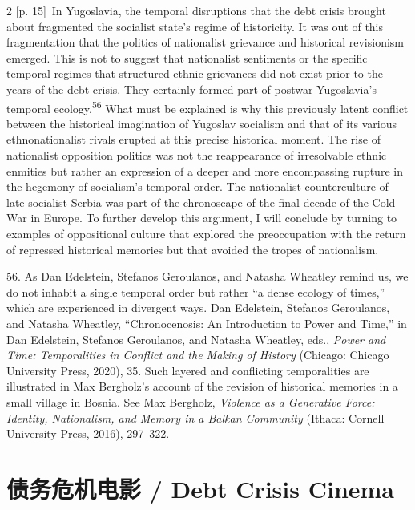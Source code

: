 \documentclass[10pt,a4paper]{article}
\begin{document}
\begin{paracol}{2}
{\scriptsize\color{gray} [p. 15]}\ In Yugoslavia, the temporal disruptions that the debt crisis brought about fragmented the socialist state’s regime of historicity. It was out of this fragmentation that the politics of nationalist grievance and historical revisionism emerged. This is not to suggest that nationalist sentiments or the specific temporal regimes that structured ethnic grievances did not exist prior to the years of the debt crisis. They certainly formed part of postwar Yugoslavia’s temporal ecology.\nobreak\textsuperscript{56} What must be explained is why this previously latent conflict between the historical imagination of Yugoslav socialism and that of its various ethnonationalist rivals erupted at this precise historical moment. The rise of nationalist opposition politics was not the reappearance of irresolvable ethnic enmities but rather an expression of a deeper and more encompassing rupture in the hegemony of socialism’s temporal order. The nationalist counterculture of late-socialist Serbia was part of the chronoscape of the final decade of the Cold War in Europe. To further develop this argument, I will conclude by turning to examples of oppositional culture that explored the preoccupation with the return of repressed historical memories but that avoided the tropes of nationalism.\par{\small 56. As Dan Edelstein, Stefanos Geroulanos, and Natasha Wheatley remind us, we do not inhabit a single temporal order but rather “a dense ecology of times,” which are experienced in divergent ways. Dan Edelstein, Stefanos Geroulanos, and Natasha Wheatley, “Chronocenosis: An Introduction to Power and Time,” in Dan Edelstein, Stefanos Geroulanos, and Natasha Wheatley, eds., \textit{Power and Time: Temporalities in Conflict and the Making of History} (Chicago: Chicago University Press, 2020), 35. Such layered and conflicting temporalities are illustrated in Max Bergholz’s account of the revision of historical memories in a small village in Bosnia. See Max Bergholz, \textit{Violence as a Generative Force: Identity, Nationalism, and Memory in a Balkan Community} (Ithaca: Cornell University Press, 2016), 297–322.\par}
\switchcolumn*
\end{paracol}
\section*{债务危机电影 / Debt Crisis Cinema}
\end{document}
